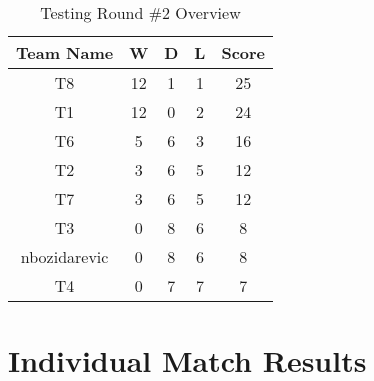 \documentclass[a4paper,12pt]{article}
\begin{document}
\begin{table}[H]
  \centering
  \caption{Testing Round \#2 Overview}
  \begin{tabular}{|c|c|c|c|c|}
    \hline
      \textbf{Team Name} & \textbf{W} & \textbf{D} & \textbf{L} & \textbf{Score} \\
      \hline
      \hline
       
        
            T8 & 12 & 1 & 1 & 25 \\
            \hline  
            
               
        
            T1 & 12 & 0 & 2 & 24 \\
            \hline  
            
               
        
            T6 & 5 & 6 & 3 & 16 \\
            \hline  
            
               
        
            T2 & 3 & 6 & 5 & 12 \\
            \hline  
            
               
        
            T7 & 3 & 6 & 5 & 12 \\
            \hline  
            
               
        
            T3 & 0 & 8 & 6 & 8 \\
            \hline  
            
               
         
          nbozidarevic & 0 & 8 & 6 & 8 \\
          \hline  
          
               
        
            T4 & 0 & 7 & 7 & 7 \\
            \hline  
            
              
                
              \end{tabular}
              \label{table:overview}
          \end{table}

          \section{Individual Match Results}
          \label{sec:all}
\end{document}
